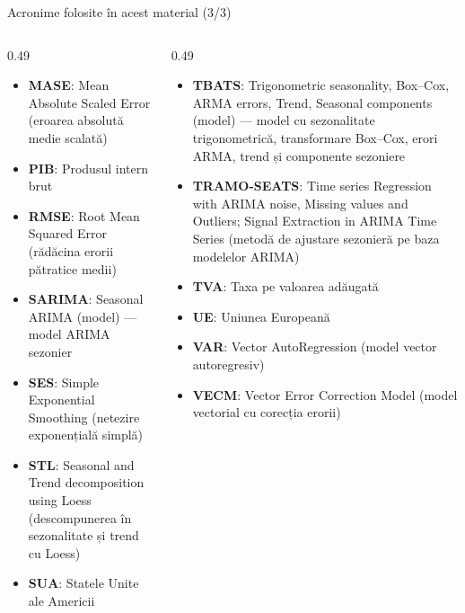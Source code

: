 \begin{frame}{Acronime folosite în acest material (3/3)}
\begin{columns}[T]
\begin{column}{0.49\textwidth}
\begin{itemize}\setlength{\itemsep}{0pt}
    \item \textbf{MASE}: Mean Absolute Scaled Error (eroarea absolută medie scalată)
    \item \textbf{PIB}: Produsul intern brut
    \item \textbf{RMSE}: Root Mean Squared Error (rădăcina erorii pătratice medii)
    \item \textbf{SARIMA}: Seasonal ARIMA (model) — model ARIMA sezonier
    \item \textbf{SES}: Simple Exponential Smoothing (netezire exponențială simplă)
    \item \textbf{STL}: Seasonal and Trend decomposition using Loess (descompunerea în sezonalitate și trend cu Loess)
    \item \textbf{SUA}: Statele Unite ale Americii
\end{itemize}
\end{column}
\begin{column}{0.49\textwidth}
\begin{itemize}\setlength{\itemsep}{0pt}
    \item \textbf{TBATS}: Trigonometric seasonality, Box–Cox, ARMA errors, Trend, Seasonal components (model) — model cu sezonalitate trigonometrică, transformare Box–Cox, erori ARMA, trend și componente sezoniere
    \item \textbf{TRAMO-SEATS}: Time series Regression with ARIMA noise, Missing values and Outliers; Signal Extraction in ARIMA Time Series (metodă de ajustare sezonieră pe baza modelelor ARIMA)
    \item \textbf{TVA}: Taxa pe valoarea adăugată
    \item \textbf{UE}: Uniunea Europeană
    \item \textbf{VAR}: Vector AutoRegression (model vector autoregresiv)
    \item \textbf{VECM}: Vector Error Correction Model (model vectorial cu corecția erorii)
\end{itemize}
\end{column}
\end{columns}
\end{frame}

